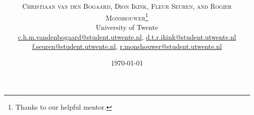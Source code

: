 \documentclass[twoside]{article}
\title{\vspace{-15mm}\fontsize{24pt}{10pt}\selectfont\textbf{\articletitle}} %
\author{
\large
\textsc{Christiaan van den Bogaard, Dion Ikink, Fleur Seuren, and Rogier Monshouwer}\thanks{Thanks to our helpful mentor.}\\[2mm] %
\normalsize University of Twente \\ %
\normalsize \href{mailto:c.h.m.vandenbogaard@student.utwente.nl}{c.h.m.vandenbogaard@student.utwente.nl},
\href{mailto:d.t.r.ikink@student.utwente.nl}{d.t.r.ikink@student.utwente.nl} \\
\normalsize\href{mailto:f.seuren@student.utwente.nl}{f.seuren@student.utwente.nl}, %
\href{mailto:r.monshouwer@student.utwente.nl}{r.monshouwer@student.utwente.nl}
}
\date{\today}
\begin{document}
\thispagestyle{empty}
\maketitle %


\begin{abstract}

\noindent \lipsum[1] %

\end{abstract}

\end{document}
